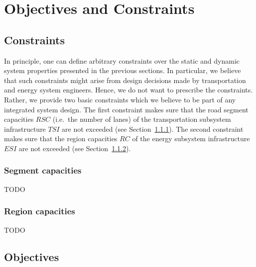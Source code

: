 
\section{Objectives and Constraints}
\subsection{Constraints}
\label{constraints}

In principle, one can define arbitrary constraints over the static and dynamic system properties presented in the previous sections. In particular, we believe that such constraints might arise from design decisions made by transportation and energy system engineers. Hence, we do not want to prescribe the constraints. Rather, we provide two basic constraints which we believe to be part of any integrated system design. The first constraint makes sure that the road segment capacities $RSC$ (i.e.\ the number of lanes) of the transportation subsystem infrastructure $TSI$ are not exceeded (see Section~\ref{collisions}). The second constraint makes sure that the region capacities $RC$ of the energy subsystem infrastructure $ESI$ are not exceeded (see Section~\ref{capacities}).

\subsubsection{Segment capacities}
\label{collisions}

TODO


\subsubsection{Region capacities}
\label{capacities}

TODO

\subsection{Objectives}
\label{objectives}

